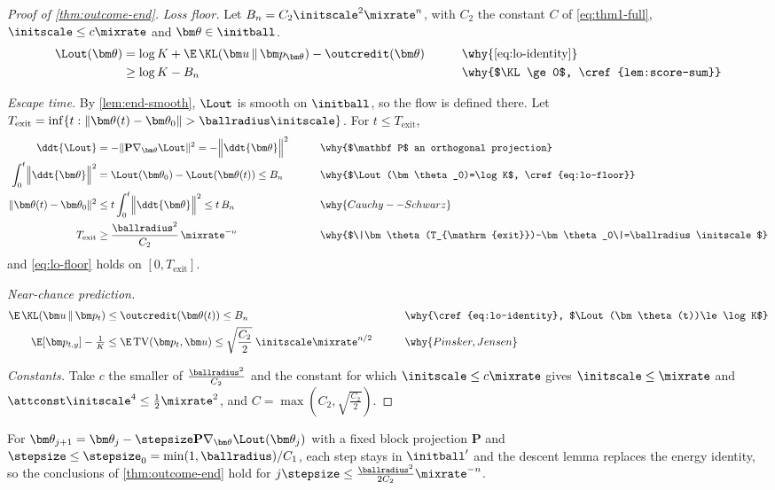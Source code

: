 \begin{proof}[Proof of \cref{thm:outcome-end}]
\emph{Loss floor.} Let $B_n=C_2\initscale^2\mixrate^n$, with $C_2$ the constant $C$ of \cref{eq:thm1-full}, $\initscale\le c\mixrate$ and $\bm\theta\in\initball$.
\begin{alignat}{2}
 \Lout(\bm\theta)&=\log K+\E\,\KL(\bm u\,\|\,\bm p_{\bm\theta})-\outcredit(\bm\theta) &\qquad& \why{\cref{eq:lo-identity}}\nonumber\\
 &\ge\log K-B_n && \why{$\KL\ge0$, \cref{lem:score-sum}}\label{eq:lo-floor}
\end{alignat}

\emph{Escape time.} By \cref{lem:end-smooth}, $\Lout$ is smooth on $\initball$, so the flow is defined there. Let
$T_{\mathrm{exit}}=\inf\{t:\|\bm\theta(t)-\bm\theta_0\|>\ballradius\initscale\}$. For $t\le T_{\mathrm{exit}}$,
\begin{alignat*}{2}
 \ddt{\Lout}&=-\|\mathbf P\nabla_{\bm\theta}\Lout\|^2=-\Bigl\|\ddt{\bm\theta}\Bigr\|^2 &\qquad& \why{$\mathbf P$ an orthogonal projection}\\
 \int_0^t\Bigl\|\ddt{\bm\theta}\Bigr\|^2&=\Lout(\bm\theta_0)-\Lout(\bm\theta(t))\le B_n && \why{$\Lout(\bm\theta_0)=\log K$, \cref{eq:lo-floor}}\\
 \|\bm\theta(t)-\bm\theta_0\|^2&\le t\int_0^t\Bigl\|\ddt{\bm\theta}\Bigr\|^2\le t\,B_n && \why{Cauchy--Schwarz}\\
 T_{\mathrm{exit}}&\ge\frac{\ballradius^2}{C_2}\,\mixrate^{-n} && \why{$\|\bm\theta(T_{\mathrm{exit}})-\bm\theta_0\|=\ballradius\initscale$}
\end{alignat*}
and \cref{eq:lo-floor} holds on $[0,T_{\mathrm{exit}}]$.

\emph{Near-chance prediction.}
\begin{alignat*}{2}
 \E\,\KL(\bm u\,\|\,\bm p_t)&\le\outcredit(\bm\theta(t))\le B_n &\qquad& \why{\cref{eq:lo-identity}, $\Lout(\bm\theta(t))\le\log K$}\\
 \E[\bm p_{t,y}]-\tfrac{1}{K}&\le\E\,\mathrm{TV}(\bm p_t,\bm u)\le\sqrt{\frac{C_2}{2}}\;\initscale\mixrate^{n/2} && \why{Pinsker, Jensen}
\end{alignat*}

\emph{Constants.} Take $c$ the smaller of $\frac{\ballradius^2}{C_2}$ and the constant for which $\initscale\le c\mixrate$ gives $\initscale\le\mixrate$ and
$\attconst\initscale^4\le\frac{1}{2}\mixrate^2$, and $C=\max(C_2,\sqrt{\frac{C_2}{2}})$.
\end{proof}
\begin{remark}
\label{rem:flow}
For $\bm\theta_{j+1}=\bm\theta_j-\stepsize\mathbf P\nabla_{\bm\theta}\Lout(\bm\theta_j)$ with a fixed block projection $\mathbf P$ and $\stepsize\le\stepsize_0=\min(1,\ballradius)/C_1$, each step stays in
$\initball'$ and the descent lemma replaces the energy identity, so the conclusions of \cref{thm:outcome-end} hold for $j\stepsize\le\frac{\ballradius^2}{2C_2}\mixrate^{-n}$.
\end{remark}

